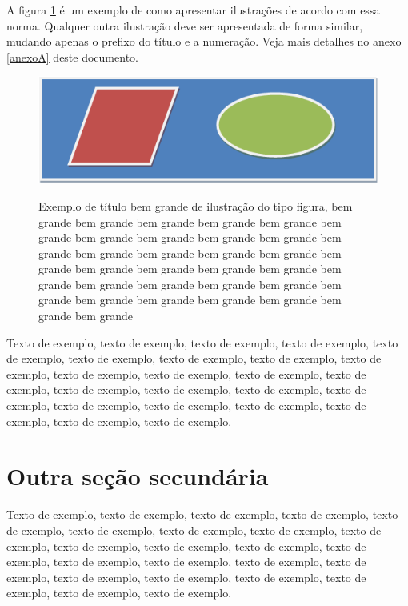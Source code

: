\documentclass[
	12pt,				%
	oneside,			%
	a4paper,			%
	english,			%
	brazil				%
	]{abntex2ppgsi}
\begin{document}
A figura \ref{fig:figura-exemplo4} é um exemplo de como apresentar ilustrações de acordo com essa norma. Qualquer outra ilustração deve ser apresentada de forma similar, mudando apenas o prefixo do título e a numeração. Veja mais detalhes no anexo \ref{anexoA} deste documento.

\begin{figure}[htbp]
	\centering
	\caption{Exemplo de título bem grande de ilustração do tipo figura, bem grande bem grande bem grande bem grande bem grande bem grande bem grande bem grande bem grande bem grande bem grande bem grande bem grande bem grande bem grande bem grande bem grande bem grande bem grande bem grande bem grande bem grande bem grande bem grande bem grande bem grande bem grande bem grande bem grande bem grande bem grande bem grande}
		\includegraphics{figuras/figura-exemplo.png}
	\label{fig:figura-exemplo4}
\end{figure}

Texto de exemplo, texto de exemplo, texto de exemplo, texto de exemplo, texto de exemplo, texto de exemplo, texto de exemplo, texto de exemplo, texto de exemplo, texto de exemplo, texto de exemplo, texto de exemplo, texto de exemplo, texto de exemplo, texto de exemplo, texto de exemplo, texto de exemplo, texto de exemplo, texto de exemplo, texto de exemplo, texto de exemplo, texto de exemplo, texto de exemplo.

\section{Outra seção secundária}

Texto de exemplo, texto de exemplo, texto de exemplo, texto de exemplo, texto de exemplo, texto de exemplo, texto de exemplo, texto de exemplo, texto de exemplo, texto de exemplo, texto de exemplo, texto de exemplo, texto de exemplo, texto de exemplo, texto de exemplo, texto de exemplo, texto de exemplo, texto de exemplo, texto de exemplo, texto de exemplo, texto de exemplo, texto de exemplo, texto de exemplo.
\end{document}
